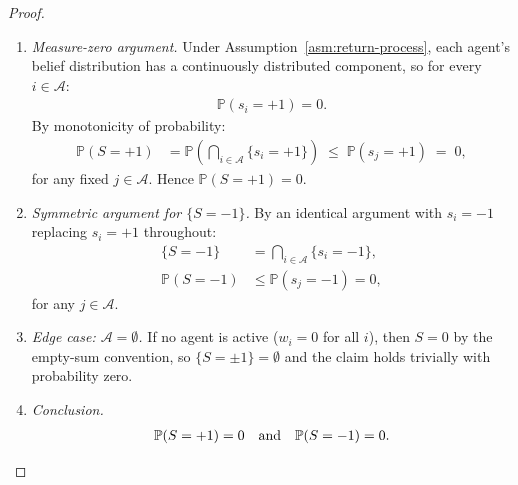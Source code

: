 \documentclass[12pt,openany]{book}
\newcommand{\Prob}{\mathbb{P}}
\numberwithin{equation}{chapter}
\theoremstyle{plain}
\theoremstyle{definition}
\theoremstyle{remark}
\numberwithin{equation}{chapter}
\theoremstyle{plain}
\begin{document}
\begin{proof}
\begin{enumerate}
\begin{enumerate}
    \item \emph{Measure-zero argument.}
      Under Assumption~\ref{asm:return-process}, each
      agent's belief distribution has a continuously
      distributed component, so for every $i \in \mathcal{A}$:
      \begin{align}
        \Prob(s_i = +1) = 0.
      \end{align}
      By monotonicity of probability:
      \begin{align}
        \Prob(S = +1)
          &= \Prob\!\left(
               \bigcap_{i \in \mathcal{A}} \{s_i = +1\}
             \right)
           \;\leq\;
           \Prob(s_j = +1)
           \;=\; 0,
      \end{align}
      for any fixed $j \in \mathcal{A}$.  Hence
      $\Prob(S = +1) = 0$.

    \item \emph{Symmetric argument for $\{S = -1\}$.}
      By an identical argument with $s_i = -1$ replacing
      $s_i = +1$ throughout:
      \begin{align}
        \{S = -1\}
          &= \bigcap_{i \in \mathcal{A}} \{s_i = -1\},\\
        \Prob(S = -1)
          &\leq \Prob(s_j = -1)
           = 0,
      \end{align}
      for any $j \in \mathcal{A}$.

    \item \emph{Edge case: $\mathcal{A} = \emptyset$.}
      If no agent is active ($w_i = 0$ for all $i$), then
      $S = 0$ by the empty-sum convention, so
      $\{S = \pm 1\} = \emptyset$ and the claim holds
      trivially with probability zero.

    \item \emph{Conclusion.}
      \begin{align}
        \Prob(S = +1) = 0
        \quad \text{and} \quad
        \Prob(S = -1) = 0. \qedhere
      \end{align}
  \end{enumerate}

\end{enumerate}
\end{proof}
\end{document}

